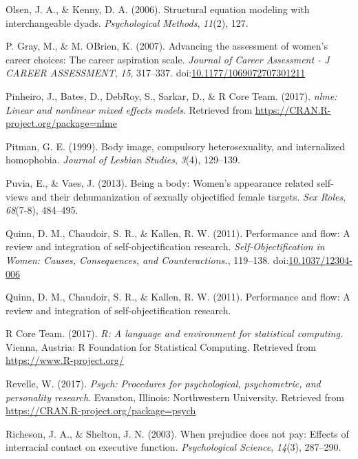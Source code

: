 \documentclass[man]{apa6}
\begin{document}
\hypertarget{ref-olsen2006structural}{}
Olsen, J. A., \& Kenny, D. A. (2006). Structural equation modeling with
interchangeable dyads. \emph{Psychological Methods}, \emph{11}(2), 127.

\hypertarget{ref-grayobrien2007}{}
P. Gray, M., \& M. OBrien, K. (2007). Advancing the assessment of
women's career choices: The career aspiration scale. \emph{Journal of
Career Assessment - J CAREER ASSESSMENT}, \emph{15}, 317--337.
doi:\href{https://doi.org/10.1177/1069072707301211}{10.1177/1069072707301211}

\hypertarget{ref-R-nlme}{}
Pinheiro, J., Bates, D., DebRoy, S., Sarkar, D., \& R Core Team. (2017).
\emph{nlme: Linear and nonlinear mixed effects models}. Retrieved from
\url{https://CRAN.R-project.org/package=nlme}

\hypertarget{ref-pitman1999body}{}
Pitman, G. E. (1999). Body image, compulsory heterosexuality, and
internalized homophobia. \emph{Journal of Lesbian Studies}, \emph{3}(4),
129--139.

\hypertarget{ref-puvia2013being}{}
Puvia, E., \& Vaes, J. (2013). Being a body: Women's appearance related
self-views and their dehumanization of sexually objectified female
targets. \emph{Sex Roles}, \emph{68}(7-8), 484--495.

\hypertarget{ref-quinnetal}{}
Quinn, D. M., Chaudoir, S. R., \& Kallen, R. W. (2011). Performance and
flow: A review and integration of self-objectification research.
\emph{Self-Objectification in Women: Causes, Consequences, and
Counteractions.}, 119--138.
doi:\href{https://doi.org/10.1037/12304-006}{10.1037/12304-006}

\hypertarget{ref-quinn2011performance}{}
Quinn, D. M., Chaudoir, S. R., \& Kallen, R. W. (2011). Performance and
flow: A review and integration of self-objectification research.

\hypertarget{ref-R-base}{}
R Core Team. (2017). \emph{R: A language and environment for statistical
computing}. Vienna, Austria: R Foundation for Statistical Computing.
Retrieved from \url{https://www.R-project.org/}

\hypertarget{ref-R-psych}{}
Revelle, W. (2017). \emph{Psych: Procedures for psychological,
psychometric, and personality research}. Evanston, Illinois:
Northwestern University. Retrieved from
\url{https://CRAN.R-project.org/package=psych}

\hypertarget{ref-richeson2003prejudice}{}
Richeson, J. A., \& Shelton, J. N. (2003). When prejudice does not pay:
Effects of interracial contact on executive function.
\emph{Psychological Science}, \emph{14}(3), 287--290.
\end{document}

